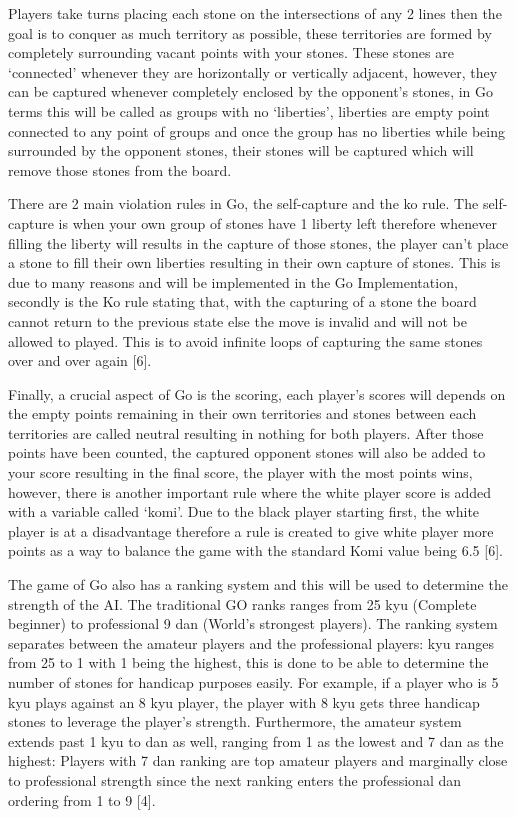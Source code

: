 \documentclass[]{final_report}
\begin{document}
Players take turns placing each stone on the intersections of any 2 lines then the goal is to conquer as much territory as possible, these territories are formed by completely surrounding vacant points with your stones. These stones are ‘connected’ whenever they are horizontally or vertically adjacent, however, they can be captured whenever completely enclosed by the opponent’s stones, in Go terms this will be called as groups with no ‘liberties’, liberties are empty point connected to any point of groups and once the group has no liberties while being surrounded by the opponent stones, their stones will be captured which will remove those stones from the board. 

There are 2 main violation rules in Go, the self-capture and the ko rule. The self-capture is when your own group of stones have 1 liberty left therefore whenever filling the liberty will results in the capture of those stones, the player can’t place a stone to fill their own liberties resulting in their own capture of stones. This is due to many reasons and will be implemented in the Go Implementation, secondly is the Ko rule stating that, with the capturing of a stone the board cannot return to the previous state else the move is invalid and will not be allowed to played. This is to avoid infinite loops of capturing the same stones over and over again [6].

Finally, a crucial aspect of Go is the scoring, each player’s scores will depends on the empty points remaining in their own territories and stones between each territories are called neutral resulting in nothing for both players. After those points have been counted, the captured opponent stones will also be added to your score resulting in the final score, the player with the most points wins, however, there is another important rule where the white player score is added with a variable called ‘komi’. Due to the black player starting first, the white player is at a disadvantage therefore a rule is created to give white player more points as a way to balance the game with the standard Komi value being 6.5 [6]. 

The game of Go also has a ranking system and this will be used to determine the strength of the AI. The traditional GO ranks ranges from 25 kyu (Complete beginner)  to professional 9 dan (World’s strongest players). The ranking system separates between the amateur players and the professional players: kyu ranges from 25 to 1 with 1 being the highest, this is done to be able to determine the number of stones for handicap purposes easily. For example, if a player who is 5 kyu plays against an 8 kyu player, the player with 8 kyu gets three handicap stones to leverage the player’s strength. Furthermore, the amateur system extends past 1 kyu to dan as well, ranging from 1 as the lowest and 7 dan as the highest: Players with 7 dan ranking are top amateur players and marginally close to professional strength since the next ranking enters the professional dan ordering from 1 to 9 [4].
\end{document}
